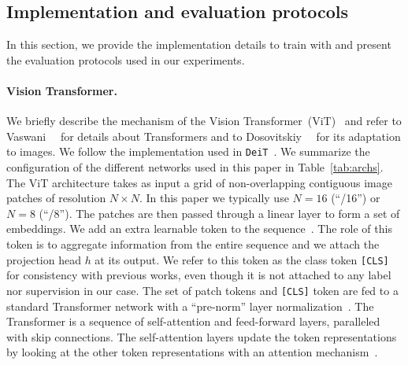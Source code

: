 \subsection{Implementation and evaluation protocols}
In this section, we provide the implementation details to train with \OURS and present the evaluation protocols used in our experiments.

\paragraph{Vision Transformer.}
We briefly describe the mechanism of the Vision Transformer~(ViT)~\cite{dosovitskiy2020image,vaswani2017attention} and refer to Vaswani~\etal~\cite{vaswani2017attention} for details about Transformers and to Dosovitskiy~\etal~\cite{dosovitskiy2020image} for its adaptation to images.
We follow the implementation used in \texttt{DeiT}~\cite{touvron2020training}.
We summarize the configuration of the different networks used in this paper in Table~\ref{tab:archs}.
The ViT architecture takes as input a grid of non-overlapping contiguous image patches of resolution $N \times N$.
In this paper we typically use $N=16$ (``/16'') or $N=8$ (``/8'').
The patches are then passed through a linear layer to form a set of embeddings.
We add an extra learnable token to the sequence~\cite{devlin2018bert,dosovitskiy2020image}.
The role of this token is to aggregate information from the entire sequence and we attach the projection head $h$ at its output.
We refer to this token as the class token \texttt{[CLS]} for consistency with previous works\cite{devlin2018bert,dosovitskiy2020image,touvron2020training}, even though it is not attached to any label nor supervision in our case.
The set of patch tokens and \texttt{[CLS]} token are fed to a standard Transformer network with a ``pre-norm'' layer normalization~\cite{chen2018best,klein2017opennmt}.
The Transformer is a sequence of self-attention and feed-forward layers, paralleled with skip connections.
The self-attention layers update the token representations by looking at the other token representations with an attention mechanism~\cite{bahdanau2014neural}.


